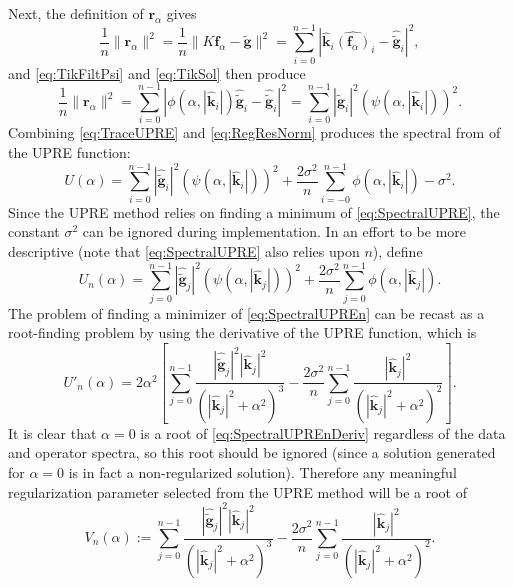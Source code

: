 \documentclass[12pt]{article}
\newcommand{\gnoise}{\widetilde{\mathbf{g}}}
\newcommand{\kdis}{\mathbf{k}}
\newcommand{\kmat}{K}	%
\newcommand{\fdis}{\mathbf{f}}
\newcommand{\regparam}{\alpha}
\newcommand{\freg}{\fdis_{\regparam}}	%
\newcommand{\filt}{\phi}
\newcommand{\mfilt}{\psi}
\newcommand{\noiseSD}{\sigma}	%
\newcommand{\regres}{\mathbf{r}_{\regparam}}	%
\newcommand{\U}{U}	%
\begin{document}
Next, the definition of $\regres$ gives
\[\frac{1}{n}\|\regres\|^2 = \frac{1}{n}\|\kmat\freg - \gnoise\|^2 = \sum_{i = 0}^{n-1} |\widehat{\kdis}_i\widehat{(\freg)}_i - \widehat{\gnoise}_i|^2,\]
and \eqref{eq:TikFiltPsi} and \eqref{eq:TikSol} then produce
\begin{equation}
\frac{1}{n}\|\regres\|^2 = \sum_{i = 0}^{n-1} |\filt(\regparam,|\widehat{\kdis}_i|)\widehat{\gnoise}_i - \widehat{\gnoise}_i|^2 = \sum_{i = 0}^{n-1} |\widehat{\gnoise}_i|^2(\mfilt(\regparam,|\widehat{\kdis}_i|))^2.
\label{eq:RegResNorm}
\end{equation}
Combining \eqref{eq:TraceUPRE} and \eqref{eq:RegResNorm} produces the spectral from of the UPRE function:
\begin{equation}
\U(\regparam) = \sum_{i = 0}^{n-1} |\widehat{\gnoise}_i|^2(\mfilt(\regparam,|\widehat{\kdis}_i|))^2 + \frac{2\noiseSD^2}{n}\sum_{i = -0}^{n-1} \filt(\regparam,|\widehat{\kdis}_i|) - \noiseSD^2.
\label{eq:SpectralUPRE}
\end{equation} 
Since the UPRE method relies on finding a minimum of \eqref{eq:SpectralUPRE}, the constant $\noiseSD^2$ can be ignored during implementation. In an effort to be more descriptive (note that \eqref{eq:SpectralUPRE} also relies upon $n$), define
\begin{equation}
\U_n(\regparam) = \sum_{j = 0}^{n-1} |\widehat{\gnoise}_j|^2(\mfilt(\regparam,|\widehat{\kdis}_j|))^2 + \frac{2\noiseSD^2}{n}\sum_{j = 0}^{n-1} \filt(\regparam,|\widehat{\kdis}_j|).
\label{eq:SpectralUPREn}
\end{equation}
The problem of finding a minimizer of \eqref{eq:SpectralUPREn} can be recast as a root-finding problem by using the derivative of the UPRE function, which is
\begin{equation}
\U'_n(\regparam) = 2\regparam^2\left[\sum_{j = 0}^{n-1} \frac{|\widehat{\gnoise}_j|^2|\widehat{\kdis}_j|^2}{(|\widehat{\kdis}_j|^2 + \regparam^2)^3} - \frac{2\noiseSD^2}{n}\sum_{j = 0}^{n-1} \frac{|\widehat{\kdis}_j|^2}{(|\widehat{\kdis}_j|^2 + \regparam^2)^2}\right].
\label{eq:SpectralUPREnDeriv}
\end{equation}
It is clear that $\regparam = 0$ is a root of \eqref{eq:SpectralUPREnDeriv} regardless of the data and operator spectra, so this root should be ignored (since a solution generated for $\regparam = 0$ is in fact a non-regularized solution). Therefore any meaningful regularization parameter selected from the UPRE method will be a root of
\begin{equation}
V_n(\regparam) := \sum_{j = 0}^{n-1} \frac{|\widehat{\gnoise}_j|^2|\widehat{\kdis}_j|^2}{(|\widehat{\kdis}_j|^2 + \regparam^2)^3} - \frac{2\noiseSD^2}{n}\sum_{j = 0}^{n-1} \frac{|\widehat{\kdis}_j|^2}{(|\widehat{\kdis}_j|^2 + \regparam^2)^2}.
\label{eq:SpectralUPREnDeriv2}
\end{equation}
\end{document}
